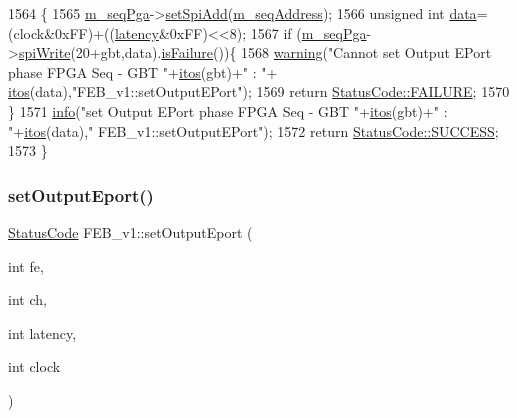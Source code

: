 \begin{DoxyCode}
1564                                                                 \{
1565   \hyperlink{classFEB__v1_a6c7804ac86796f233a8393043adf2e77}{m\_seqPga}->\hyperlink{classSeqPGA_ac998ce3a6d9b5f2e88cc8393f8c1df53}{setSpiAdd}(\hyperlink{classFEB__v1_a1c1eb093fd1733b9510fcf8bc5c7ad08}{m\_seqAddress});
1566   \textcolor{keywordtype}{unsigned} \textcolor{keywordtype}{int} \hyperlink{classFEB__v1_a6bca4320bd3bbbc32efc81097f33421a}{data}=(clock&0xFF)+((\hyperlink{classFEB__v1_a68050d232efd8d6568910b09a2c18f62}{latency}&0xFF)<<8);
1567   \textcolor{keywordflow}{if} (\hyperlink{classFEB__v1_a6c7804ac86796f233a8393043adf2e77}{m\_seqPga}->\hyperlink{classSeqPGA_ad4421841ce4ce8b88ad13f63216f0743}{spiWrite}(20+gbt,data).\hyperlink{classStatusCode_a5dd22dc6eb2c52fc4cabc58f6dea2eb7}{isFailure}())\{
1568     \hyperlink{classObject_a65cd4fda577711660821fd2cd5a3b4c9}{warning}(\textcolor{stringliteral}{"Cannot set Output EPort phase FPGA Seq - GBT "}+\hyperlink{Tools_8h_af330027dbdafb9a30768b3613c553e60}{itos}(gbt)+\textcolor{stringliteral}{" : "}+
      \hyperlink{Tools_8h_af330027dbdafb9a30768b3613c553e60}{itos}(data),\textcolor{stringliteral}{"FEB\_v1::setOutputEPort"});
1569     \textcolor{keywordflow}{return} \hyperlink{classStatusCode_a6f565cbeadc76d14c72f047e5e85eb4ba3da73d4c469762eb9d3c960368252b26}{StatusCode::FAILURE};
1570   \}
1571   \hyperlink{classObject_a644fd329ea4cb85f54fa6846484b84a8}{info}(\textcolor{stringliteral}{"set Output EPort phase FPGA Seq - GBT "}+\hyperlink{Tools_8h_af330027dbdafb9a30768b3613c553e60}{itos}(gbt)+\textcolor{stringliteral}{" : "}+\hyperlink{Tools_8h_af330027dbdafb9a30768b3613c553e60}{itos}(data),\textcolor{stringliteral}{"
      FEB\_v1::setOutputEPort"});
1572   \textcolor{keywordflow}{return} \hyperlink{classStatusCode_a6f565cbeadc76d14c72f047e5e85eb4badd0da38d3ba0d922efd1f4619bc37ad8}{StatusCode::SUCCESS};
1573 \}
\end{DoxyCode}
\mbox{\label{classFEB__v1_ae8ed47630ca1408647e3eb5c1dfa0ec0}} 
\subsubsection{\texorpdfstring{set\+Output\+Eport()}{setOutputEport()}\hspace{0.1cm}{\footnotesize\ttfamily [2/2]}}
{\footnotesize\ttfamily \hyperlink{classStatusCode}{Status\+Code} F\+E\+B\+\_\+v1\+::set\+Output\+Eport (\begin{DoxyParamCaption}\item[{int}]{fe,  }\item[{int}]{ch,  }\item[{int}]{latency,  }\item[{int}]{clock }\end{DoxyParamCaption})}



